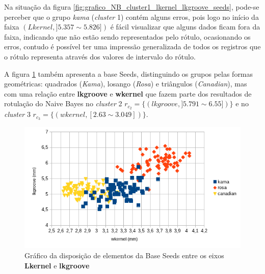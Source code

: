 Na situação da figura \ref{fig:grafico_NB_cluster1_lkernel_lkgroove_seeds}, pode-se perceber que o grupo \textit{kama} (\textit{cluster} 1) contém alguns erros, pois logo no início da faixa ${ (Lkernel, ] 5.357 \sim  5.826 ]) }$ é fácil visualizar que alguns dados ficam fora da faixa, indicando que não estão sendo representados pelo rótulo, ocasionando os erros, contudo é possível ter uma impressão generalizada de todos os registros que o rótulo representa através dos valores de intervalo do rótulo. 

A figura \ref{fig:grafico_NB_cluster1_2_wkernel_lkgroove_seeds} também apresenta a base Seeds, distinguindo os grupos pelas formas geométricas: quadrados (\textit{Kama}), losango (\textit{Rosa}) e triângulos (\textit{Canadian}), mas com uma relação entre \textbf{lkgroove} e \textbf{wkernel} que fazem parte dos resultados de rotulação do Naive Bayes no \textit{cluster} 2 ${r_{c_2}=\{ (lkgroove, ] 5.791 \sim  6.55]) \} }$ e no \textit{cluster} 3 ${r_{c_3}=\{ (wkernel, [2.63 \sim  3.049])\} }$.
 
\begin{figure}[h!]
        \centering
        \includegraphics[scale=0.9]{figs/grafico_NB_cluster1_2_wkernel_lkgroove_seeds.png}
        \caption{Gráfico da disposição de elementos da Base Seeds entre os eixos \textbf{Lkernel} e \textbf{lkgroove}} \label{fig:grafico_NB_cluster1_2_wkernel_lkgroove_seeds}
\end{figure}
 

